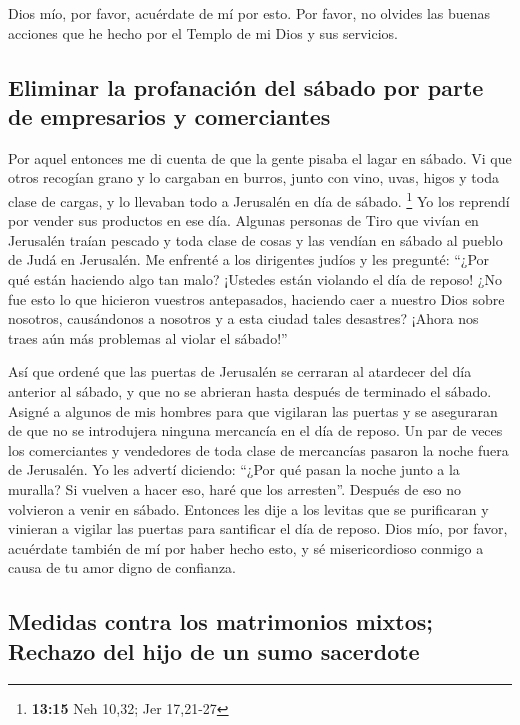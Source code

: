  Dios mío, por favor, acuérdate de mí por esto. Por
favor, no olvides las buenas acciones que he hecho por el Templo de mi
Dios y sus servicios.

\hypertarget{eliminar-la-profanaciuxf3n-del-suxe1bado-por-parte-de-empresarios-y-comerciantes}{%
\subsection{Eliminar la profanación del sábado por parte de empresarios
y
comerciantes}\label{eliminar-la-profanaciuxf3n-del-suxe1bado-por-parte-de-empresarios-y-comerciantes}}

 Por aquel entonces me di cuenta de que la gente pisaba
el lagar en sábado. Vi que otros recogían grano y lo cargaban en burros,
junto con vino, uvas, higos y toda clase de cargas, y lo llevaban todo a
Jerusalén en día de sábado. \footnote{\textbf{13:15} Neh 10,32; Jer
  17,21-27}  Yo los reprendí por vender sus productos en
ese día.  Algunas personas de Tiro que vivían en
Jerusalén traían pescado y toda clase de cosas y las vendían en sábado
al pueblo de Judá en Jerusalén.  Me enfrenté a los
dirigentes judíos y les pregunté: ``¿Por qué están haciendo algo tan
malo? ¡Ustedes están violando el día de reposo! ¿No fue esto lo que
hicieron vuestros antepasados, haciendo caer a nuestro Dios sobre
nosotros, causándonos a nosotros y a esta ciudad tales desastres? ¡Ahora
nos traes aún más problemas al violar el sábado!''

 Así que ordené que las puertas de Jerusalén se cerraran
al atardecer del día anterior al sábado, y que no se abrieran hasta
después de terminado el sábado. Asigné a algunos de mis hombres para que
vigilaran las puertas y se aseguraran de que no se introdujera ninguna
mercancía en el día de reposo.  Un par de veces los
comerciantes y vendedores de toda clase de mercancías pasaron la noche
fuera de Jerusalén.  Yo les advertí diciendo: ``¿Por qué
pasan la noche junto a la muralla? Si vuelven a hacer eso, haré que los
arresten''. Después de eso no volvieron a venir en sábado.
 Entonces les dije a los levitas que se purificaran y
vinieran a vigilar las puertas para santificar el día de reposo. Dios
mío, por favor, acuérdate también de mí por haber hecho esto, y sé
misericordioso conmigo a causa de tu amor digno de confianza.

\hypertarget{medidas-contra-los-matrimonios-mixtos-rechazo-del-hijo-de-un-sumo-sacerdote}{%
\subsection{Medidas contra los matrimonios mixtos; Rechazo del hijo de
un sumo
sacerdote}\label{medidas-contra-los-matrimonios-mixtos-rechazo-del-hijo-de-un-sumo-sacerdote}}

